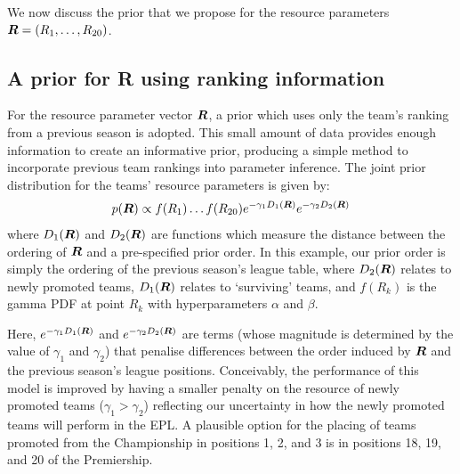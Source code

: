 We now discuss the prior that we propose for the resource parameters \(\boldsymbol{R} = (R_1, \ldots, R_{20})\).

\subsection{A prior for R using ranking information} 
\label{sec:A_prior_for_R}


For the resource parameter vector \(\boldsymbol{R}\), a prior which uses only the team's ranking from a previous season is
adopted. This small amount of data provides enough information to create an informative prior, producing a simple method
to incorporate previous team rankings into parameter inference. The joint prior distribution for the teams' resource
parameters is given by:
\begin{align}
p(\boldsymbol{R}) \propto f(R_1) \ldots f(R_{20}) e^{-\gamma_1 D_1(\boldsymbol{R})} e^{-\gamma_2 D_2(\boldsymbol{R})}
\end{align}
where \(D_1(\boldsymbol{R})\) and \(D_2(\boldsymbol{R})\) are functions which measure the distance between the ordering of \(\boldsymbol{R}\)
and a pre-specified prior order. In this example, our prior order is simply the ordering of the previous season's league
table, where \(D_2(\boldsymbol{R})\) relates to newly promoted teams, \(D_1(\boldsymbol{R})\) relates to `surviving' teams, and
\(f(R_k)\) is the gamma \gls{PDF} at point \(R_k\) with hyperparameters \(\alpha\) and \(\beta\).

Here, \(e^{-\gamma_1 D_1(\boldsymbol{R})}\)  and \(e^{-\gamma_2 D_2(\boldsymbol{R})}\) are terms (whose magnitude is
determined by the value of \(\gamma_1\) and \(\gamma_2\)) that penalise differences between the order induced by
\(\boldsymbol{R}\) and the previous season's league positions. Conceivably, the performance of this model is improved by
having a smaller penalty on the resource of newly promoted teams (\(\gamma_1 > \gamma_2\)) reflecting our uncertainty in
how the newly promoted teams will perform in the \gls{EPL}. A plausible option for the placing of teams promoted from
the Championship in positions 1, 2, and 3 is in positions 18, 19, and 20 of the Premiership.

